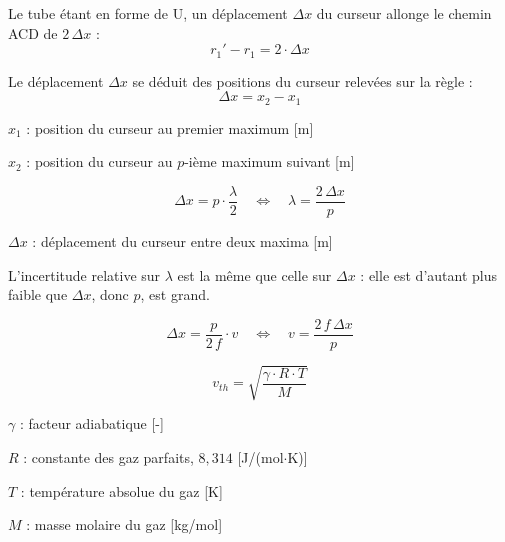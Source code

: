 Le tube étant en forme de U, un déplacement $\Delta x$ du curseur allonge le chemin ACD de $2\,\Delta x$ :
\begin{equation}
  r_1' - r_1 = 2 \cdot \Delta x
\end{equation}

Le déplacement $\Delta x$ se déduit des positions du curseur relevées sur la règle :
\begin{equation}
  \Delta x = x_2 - x_1
  \label{eq:deplacement-positions}
\end{equation}
\begin{legendevar}
  \item $x_1$ : position du curseur au premier maximum [m]
  \item $x_2$ : position du curseur au $p$-ième maximum suivant [m]
\end{legendevar}

\begin{equation}
  \Delta x = p \cdot \frac{\lambda}{2}
  \quad\Longleftrightarrow\quad
  \lambda = \frac{2\,\Delta x}{p}
  \label{eq:deplacement-longueur-onde}
\end{equation}
\begin{legendevar}
  \item $\Delta x$ : déplacement du curseur entre deux maxima [m]
\end{legendevar}

L'incertitude relative sur $\lambda$ est la même que celle sur $\Delta x$ : elle est d'autant plus faible que $\Delta x$, donc $p$, est grand.

\begin{equation}
  \Delta x = \frac{p}{2\,f} \cdot v
  \quad\Longleftrightarrow\quad
  v = \frac{2\,f\,\Delta x}{p}
  \label{eq:vitesse-mesuree}
\end{equation}

\begin{equation}
  v_{th} = \sqrt{\frac{\gamma \cdot R \cdot T}{M}}
  \label{eq:vitesse-theorique}
\end{equation}
\begin{legendevar}
  \item $\gamma$ : facteur adiabatique [-]
  \item $R$ : constante des gaz parfaits, $8{,}314$ [J/(mol$\cdot$K)]
  \item $T$ : température absolue du gaz [K]
  \item $M$ : masse molaire du gaz [kg/mol]
\end{legendevar}

